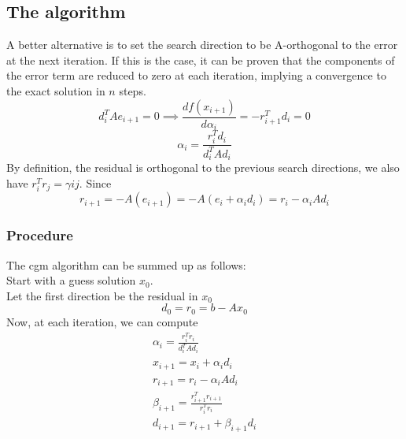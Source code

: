 \documentclass{article}
\begin{document}
\subsection{The algorithm}
A better alternative is to set the search direction to be A-orthogonal to the error at the next iteration. If this is the case, it can be proven that the components of the error term are reduced to zero at each iteration, implying a convergence to the exact solution in $n$ steps.
\begin{equation}
    d^T_i Ae_{i+1} = 0 \implies \frac{d f(x_{i+1})}{d\alpha_i} = -r_{i+1}^T d_i = 0
\end{equation}
\begin{equation}
    \alpha_i = \frac{r_i^T d_i}{d_i^T A d_i}
\end{equation}
By definition, the residual is orthogonal to the previous search directions, we also have $r_i^T r_j=\gamma{ij}$. Since
\begin{equation}
    r_{i+1} = -A(e_{i+1}) = -A(e_i + \alpha_i d_i) = r_i - \alpha_i A d_i
\end{equation}
\subsubsection{Procedure}
The cgm algorithm can be summed up as follows:
\\Start with a guess solution $x_0$.
\\Let the first direction be the residual in $x_0$
\begin{equation}
    d_0 = r_0 = b-Ax_0
\end{equation}
Now, at each iteration, we can compute
\begin{align*}
    \alpha_i = \frac{r_i^T r_i}{d_i^T A d_i}  
    \\x_{i+1} = x_i + \alpha_i d_i
    \\r_{i+1} = r_i - \alpha_i A d_i
    \\\beta_{i+1} = \frac{r_{i+1}^T r_{i+1}}{r_i^T r_i}
    \\d_{i+1} = r_{i+1} + \beta_{i+1} d_i
\end{align*}

\end{document}
